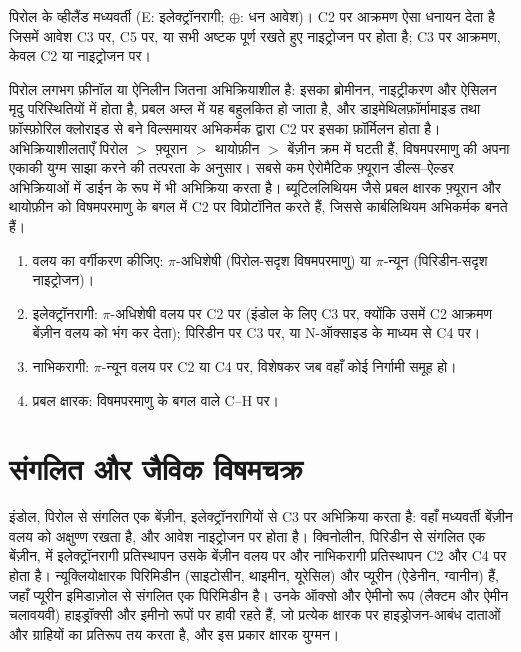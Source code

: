 \begin{omfigure}
{\small पिरोल के व्हीलैंड मध्यवर्ती (E: इलेक्ट्रॉनरागी; $\oplus$: धन आवेश)।
C2 पर आक्रमण ऐसा धनायन देता है जिसमें आवेश C3 पर, C5 पर, या सभी अष्टक पूर्ण
रखते हुए नाइट्रोजन पर होता है; C3 पर आक्रमण, केवल C2 या नाइट्रोजन पर।}
\end{omfigure}

पिरोल लगभग फ़ीनॉल या ऐनिलीन जितना अभिक्रियाशील है: इसका ब्रोमीनन, नाइट्रीकरण
और ऐसिलन मृदु परिस्थितियों में होता है, प्रबल अम्ल में यह बहुलकित हो जाता है, और
डाइमेथिलफ़ॉर्मामाइड तथा फ़ॉस्फ़ोरिल क्लोराइड से बने विल्समायर अभिकर्मक द्वारा C2 पर इसका
फ़ॉर्मिलन होता है। अभिक्रियाशीलताएँ पिरोल $>$ फ़्यूरान $>$ थायोफ़ीन $>$ बेंज़ीन क्रम में घटती हैं,
विषमपरमाणु की अपना एकाकी युग्म साझा करने की तत्परता के अनुसार। सबसे कम ऐरोमैटिक
फ़्यूरान डील्स--ऐल्डर अभिक्रियाओं में डाईन के रूप में भी अभिक्रिया करता है। ब्यूटिललिथियम
जैसे प्रबल क्षारक फ़्यूरान और थायोफ़ीन को विषमपरमाणु के बगल में C2 पर
विप्रोटॉनित करते हैं, जिससे कार्बलिथियम अभिकर्मक बनते हैं।

\begin{method}\label{met:b3:heterocycles:site}
\begin{enumerate}
  \item वलय का वर्गीकरण कीजिए: $\pi$-अधिशेषी (पिरोल-सदृश विषमपरमाणु) या $\pi$-न्यून
        (पिरिडीन-सदृश नाइट्रोजन)।
  \item इलेक्ट्रॉनरागी: $\pi$-अधिशेषी वलय पर C2 पर (इंडोल के लिए C3 पर, क्योंकि उसमें C2 आक्रमण
        बेंज़ीन वलय को भंग कर देता); पिरिडीन पर C3 पर, या
        N-ऑक्साइड के माध्यम से C4 पर।
  \item नाभिकरागी: $\pi$-न्यून वलय पर C2 या C4 पर, विशेषकर जब वहाँ कोई निर्गामी
        समूह हो।
  \item प्रबल क्षारक: विषमपरमाणु के बगल वाले C--H पर।
\end{enumerate}
\end{method}

\section{संगलित और जैविक विषमचक्र}

इंडोल, पिरोल से संगलित एक बेंज़ीन, इलेक्ट्रॉनरागियों से C3 पर अभिक्रिया करता है: वहाँ
मध्यवर्ती बेंज़ीन वलय को अक्षुण्ण रखता है, और आवेश नाइट्रोजन पर होता है।
क्विनोलीन, पिरिडीन से संगलित एक बेंज़ीन, में इलेक्ट्रॉनरागी प्रतिस्थापन उसके
बेंज़ीन वलय पर और नाभिकरागी प्रतिस्थापन C2 और C4 पर होता है। न्यूक्लियोक्षारक
पिरिमिडीन (साइटोसीन, थाइमीन, यूरेसिल) और प्यूरीन (ऐडेनीन, ग्वानीन) हैं, जहाँ प्यूरीन
इमिडाज़ोल से संगलित एक पिरिमिडीन है। उनके ऑक्सो और ऐमीनो रूप (लैक्टम और ऐमीन
चलावयवी) हाइड्रॉक्सी और इमीनो रूपों पर हावी रहते हैं, जो प्रत्येक क्षारक पर
हाइड्रोजन-आबंध दाताओं और ग्राहियों का प्रतिरूप तय करता है, और इस प्रकार क्षारक युग्मन।

